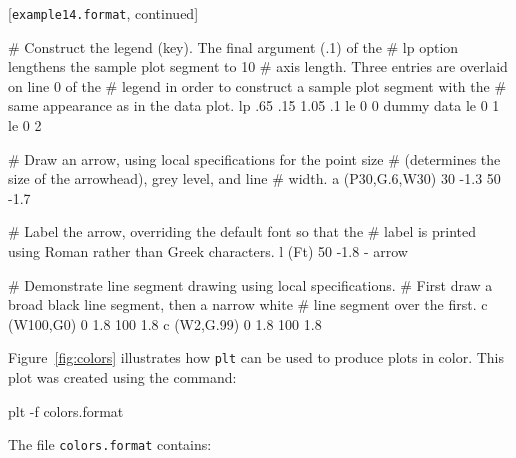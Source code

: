 \documentclass{book}
\begin{document}
\begin{center}
[{\tt example14.format}, continued]

\begin{boxedverbatim}
# Construct the legend (key).  The final argument (.1) of the
# lp option lengthens the sample plot segment to 10%
# axis length.  Three entries are overlaid on line 0 of the
# legend in order to construct a sample plot segment with the
# same appearance as in the data plot.
lp .65 .15 1.05 .1
le 0 0 dummy data
le 0 1
le 0 2

# Draw an arrow, using local specifications for the point size
# (determines the size of the arrowhead), grey level, and line
# width.
a (P30,G.6,W30) 30 -1.3 50 -1.7

# Label the arrow, overriding the default font so that the
# label is printed  using Roman rather than Greek characters.
l (Ft) 50 -1.8 - arrow

# Demonstrate line segment drawing using local specifications.
# First draw  a broad black line segment, then a narrow white
# line segment over the first.
c (W100,G0) 0 1.8 100 1.8
c (W2,G.99) 0 1.8 100 1.8
\end{boxedverbatim}
\end{center}

\newpage

%
Figure~\ref{fig:colors} illustrates how {\tt plt} can be used to produce
plots in color.  This plot was created using the command:
\begin{center}
\begin{boxedverbatim}
plt -f colors.format
\end{boxedverbatim}
\end{center}
The file {\tt colors.format} contains:
\begin{center}
\end{center}
\end{document}
